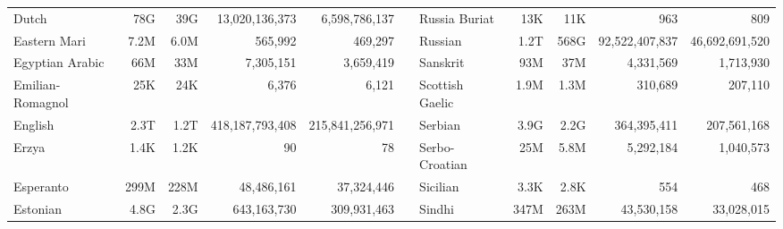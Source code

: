 \begin{table*}[t!]
{\begin{tabular}{@{}lrrrrclrrrr@{}}
            Dutch                     & 78G                      & 39G                       & 13,020,136,373           & 6,598,786,137             &                          & Russia Buriat             & 13K                      & 11K                       & 963                      & 809                       \\
            Eastern Mari              & 7.2M                     & 6.0M                      & 565,992                  & 469,297                   &                          & Russian                   & 1.2T                     & 568G                      & 92,522,407,837           & 46,692,691,520            \\
            Egyptian Arabic           & 66M                      & 33M                       & 7,305,151                & 3,659,419                 &                          & Sanskrit                  & 93M                      & 37M                       & 4,331,569                & 1,713,930                 \\
            Emilian-Romagnol          & 25K                      & 24K                       & 6,376                    & 6,121                     &                          & Scottish Gaelic           & 1.9M                     & 1.3M                      & 310,689                  & 207,110                   \\
            English                   & 2.3T                     & 1.2T                      & 418,187,793,408          & 215,841,256,971           &                          & Serbian                   & 3.9G                     & 2.2G                      & 364,395,411              & 207,561,168               \\
            Erzya                     & 1.4K                     & 1.2K                      & 90                       & 78                        &                          & Serbo-Croatian            & 25M                      & 5.8M                      & 5,292,184                & 1,040,573                 \\
            Esperanto                 & 299M                     & 228M                      & 48,486,161               & 37,324,446                &                          & Sicilian                  & 3.3K                     & 2.8K                      & 554                      & 468                       \\
            Estonian                  & 4.8G                     & 2.3G                      & 643,163,730              & 309,931,463               &                          & Sindhi                    & 347M                     & 263M                      & 43,530,158               & 33,028,015                \\

\end{tabular}}
\end{table*}
